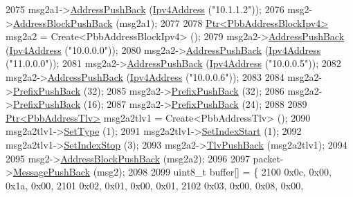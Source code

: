 \begin{DoxyCode}
2075     msg2a1->\hyperlink{classns3_1_1PbbAddressBlock_a7be545a53d69bd426dbebcf752ed8371}{AddressPushBack} (\hyperlink{classns3_1_1Ipv4Address}{Ipv4Address} (\textcolor{stringliteral}{"10.1.1.2"}));
2076     msg2->\hyperlink{classns3_1_1PbbMessage_a5f623bad2fb1adde7da885e1c92d5311}{AddressBlockPushBack} (msg2a1);
2077 
2078     \hyperlink{classns3_1_1Ptr}{Ptr<PbbAddressBlockIpv4>} msg2a2 = Create<PbbAddressBlockIpv4> ();
2079     msg2a2->\hyperlink{classns3_1_1PbbAddressBlock_a7be545a53d69bd426dbebcf752ed8371}{AddressPushBack} (\hyperlink{classns3_1_1Ipv4Address}{Ipv4Address} (\textcolor{stringliteral}{"10.0.0.0"}));
2080     msg2a2->\hyperlink{classns3_1_1PbbAddressBlock_a7be545a53d69bd426dbebcf752ed8371}{AddressPushBack} (\hyperlink{classns3_1_1Ipv4Address}{Ipv4Address} (\textcolor{stringliteral}{"11.0.0.0"}));
2081     msg2a2->\hyperlink{classns3_1_1PbbAddressBlock_a7be545a53d69bd426dbebcf752ed8371}{AddressPushBack} (\hyperlink{classns3_1_1Ipv4Address}{Ipv4Address} (\textcolor{stringliteral}{"10.0.0.5"}));
2082     msg2a2->\hyperlink{classns3_1_1PbbAddressBlock_a7be545a53d69bd426dbebcf752ed8371}{AddressPushBack} (\hyperlink{classns3_1_1Ipv4Address}{Ipv4Address} (\textcolor{stringliteral}{"10.0.0.6"}));
2083 
2084     msg2a2->\hyperlink{classns3_1_1PbbAddressBlock_a8e6f539ccffd043a2890396d882d0a42}{PrefixPushBack} (32);
2085     msg2a2->\hyperlink{classns3_1_1PbbAddressBlock_a8e6f539ccffd043a2890396d882d0a42}{PrefixPushBack} (32);
2086     msg2a2->\hyperlink{classns3_1_1PbbAddressBlock_a8e6f539ccffd043a2890396d882d0a42}{PrefixPushBack} (16);
2087     msg2a2->\hyperlink{classns3_1_1PbbAddressBlock_a8e6f539ccffd043a2890396d882d0a42}{PrefixPushBack} (24);
2088 
2089     \hyperlink{classns3_1_1Ptr}{Ptr<PbbAddressTlv>} msg2a2tlv1 = Create<PbbAddressTlv> ();
2090     msg2a2tlv1->\hyperlink{classns3_1_1PbbTlv_a90a0452018ed364ac37c3ad116dd718b}{SetType} (1);
2091     msg2a2tlv1->\hyperlink{classns3_1_1PbbAddressTlv_a82d685ae4e4e2f6d2532cb212f5b2797}{SetIndexStart} (1);
2092     msg2a2tlv1->\hyperlink{classns3_1_1PbbAddressTlv_af37ebd0d99b8b894fee7cca449d7adb9}{SetIndexStop} (3);
2093     msg2a2->\hyperlink{classns3_1_1PbbAddressBlock_a6e33cd1452dd3ff753de3e3c99e473a5}{TlvPushBack} (msg2a2tlv1);
2094 
2095     msg2->\hyperlink{classns3_1_1PbbMessage_a5f623bad2fb1adde7da885e1c92d5311}{AddressBlockPushBack} (msg2a2);
2096 
2097     packet->\hyperlink{classns3_1_1PbbPacket_a4a3170001ef758d9c9c4375b8f089826}{MessagePushBack} (msg2);
2098 
2099     uint8\_t buffer[] = \{
2100       0x0c, 0x00, 0x1a, 0x00,
2101       0x02, 0x01, 0x00, 0x01,
2102       0x03, 0x00, 0x08, 0x00,

\end{DoxyCode}

